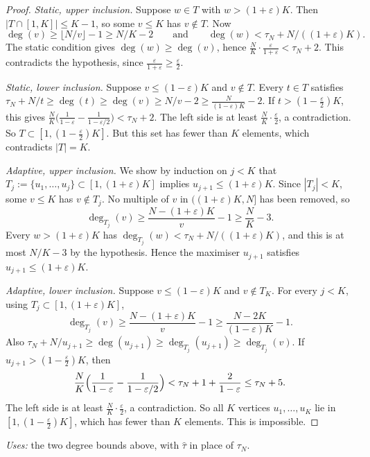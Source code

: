 \documentclass[11pt]{amsart}
\theoremstyle{definition}
\newcommand{\uses}[1]{\par\smallskip\noindent\textit{Uses:} #1\par\smallskip}
\begin{document}
\begin{proof}
\emph{Static, upper inclusion.} Suppose $w\in T$ with $w>(1+\varepsilon)K$. Then $|T\cap[1,K]|\le K-1$, so some $v\le K$ has $v\notin T$. Now
\[
\deg(v)\ge\lfloor N/v\rfloor-1\ge N/K-2\qquad\text{and}\qquad\deg(w)<\tau_N+N/((1+\varepsilon)K).
\]
The static condition gives $\deg(w)\ge\deg(v)$, hence $\frac NK\cdot\frac{\varepsilon}{1+\varepsilon}<\tau_N+2$. This contradicts the hypothesis, since $\frac\varepsilon{1+\varepsilon}\ge\frac\varepsilon2$.

\emph{Static, lower inclusion.} Suppose $v\le(1-\varepsilon)K$ and $v\notin T$. Every $t\in T$ satisfies $\tau_N+N/t\ge\deg(t)\ge\deg(v)\ge N/v-2\ge\frac{N}{(1-\varepsilon)K}-2$. If $t>(1-\frac\varepsilon2)K$, this gives $\frac NK\bigl(\frac1{1-\varepsilon}-\frac1{1-\varepsilon/2}\bigr)<\tau_N+2$. The left side is at least $\frac NK\cdot\frac\varepsilon2$, a contradiction. So $T\subset[1,(1-\frac\varepsilon2)K]$. But this set has fewer than $K$ elements, which contradicts $|T|=K$.

\emph{Adaptive, upper inclusion.} We show by induction on $j<K$ that $T_j:=\{u_1,\dots,u_j\}\subset[1,(1+\varepsilon)K]$ implies $u_{j+1}\le(1+\varepsilon)K$. Since $|T_j|<K$, some $v\le K$ has $v\notin T_j$. No multiple of $v$ in $((1+\varepsilon)K,N]$ has been removed, so
\[
\deg_{T_j}(v)\ge\frac{N-(1+\varepsilon)K}{v}-1\ge\frac NK-3 .
\]
Every $w>(1+\varepsilon)K$ has $\deg_{T_j}(w)<\tau_N+N/((1+\varepsilon)K)$, and this is at most $N/K-3$ by the hypothesis. Hence the maximiser $u_{j+1}$ satisfies $u_{j+1}\le(1+\varepsilon)K$.

\emph{Adaptive, lower inclusion.} Suppose $v\le(1-\varepsilon)K$ and $v\notin T_K$. For every $j<K$, using $T_j\subset[1,(1+\varepsilon)K]$,
\[
\deg_{T_j}(v)\ge\frac{N-(1+\varepsilon)K}{v}-1\ge\frac{N-2K}{(1-\varepsilon)K}-1 .
\]
Also $\tau_N+N/u_{j+1}\ge\deg(u_{j+1})\ge\deg_{T_j}(u_{j+1})\ge\deg_{T_j}(v)$. If $u_{j+1}>(1-\frac\varepsilon2)K$, then
\[
\frac NK\Bigl(\frac1{1-\varepsilon}-\frac1{1-\varepsilon/2}\Bigr)<\tau_N+1+\frac{2}{1-\varepsilon}\le\tau_N+5 .
\]
The left side is at least $\frac NK\cdot\frac\varepsilon2$, a contradiction. So all $K$ vertices $u_1,\dots,u_K$ lie in $[1,(1-\frac\varepsilon2)K]$, which has fewer than $K$ elements. This is impossible.
\end{proof}
\uses{the two degree bounds above, with $\hat\tau$ in place of $\tau_N$.}
\end{document}
